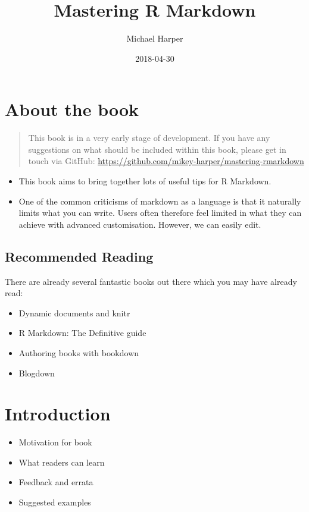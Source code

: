 \documentclass[]{book}
\title{Mastering R Markdown}
\author{Michael Harper}
\date{2018-04-30}
\providecommand{\tightlist}{%
  \setlength{\itemsep}{0pt}\setlength{\parskip}{0pt}}
\theoremstyle{definition}
\theoremstyle{definition}
\theoremstyle{definition}
\theoremstyle{remark}
\begin{document}
\maketitle

{
\setcounter{tocdepth}{1}
\tableofcontents
}
\chapter{About the book}\label{about-the-book}

\begin{quote}
This book is in a very early stage of development. If you have any
suggestions on what should be included within this book, please get in
touch via GitHub:
\url{https://github.com/mikey-harper/mastering-rmarkdown}
\end{quote}

\begin{itemize}
\tightlist
\item
  This book aims to bring together lots of useful tips for R Markdown.
\item
  One of the common criticisms of markdown as a language is that it
  naturally limits what you can write. Users often therefore feel
  limited in what they can achieve with advanced customisation. However,
  we can easily edit.
\end{itemize}

\section{Recommended Reading}\label{recommended-reading}

There are already several fantastic books out there which you may have
already read:

\begin{itemize}
\tightlist
\item
  Dynamic documents and knitr
\item
  R Markdown: The Definitive guide
\item
  Authoring books with bookdown
\item
  Blogdown
\end{itemize}

\chapter{Introduction}\label{intro}

\begin{itemize}
\tightlist
\item
  Motivation for book
\item
  What readers can learn
\item
  Feedback and errata
\item
  Suggested examples
\end{itemize}
\end{document}

